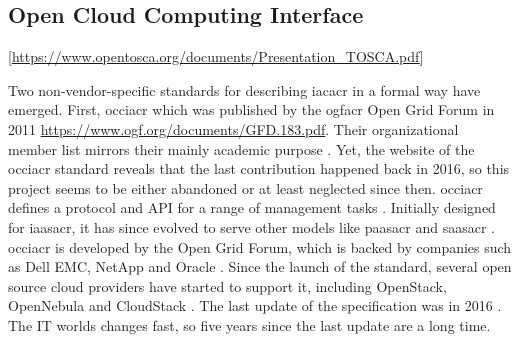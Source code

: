 \subsection{Open Cloud Computing Interface} %
[\url{https://www.opentosca.org/documents/Presentation\_TOSCA.pdf}]

Two non-vendor-specific standards for describing \gls{iacacr} in a formal way have emerged. First, \gls{occiacr} which was published by the \gls{ogfacr} Open Grid Forum in 2011 \url{https://www.ogf.org/documents/GFD.183.pdf}. Their organizational member list mirrors their mainly academic purpose \cite{ogf_members}. Yet, the website of the \gls{occiacr} standard reveals that the last contribution happened back in 2016, so this project seems to be either abandoned or at least neglected since then.
\newline
\Gls{occiacr} defines a protocol and API for a range of management tasks \cite{occi_about}. Initially designed for \gls{iaasacr}, it has since evolved to serve other models like \gls{paasacr} and \gls{saasacr} \cite{occi_about}. \Gls{occiacr} is developed by the Open Grid Forum, which is backed by companies such as Dell EMC, NetApp and Oracle \cite{hpcinthecloud_next_ogf} \cite{networkworld_ogf}. Since the launch of the standard, several open source cloud providers have started to support it, including OpenStack, OpenNebula and CloudStack \cite{occi_implementations}. The last update of the specification was in 2016 \cite{occi_index}. The IT worlds changes fast, so five years since the last update are a long time.

